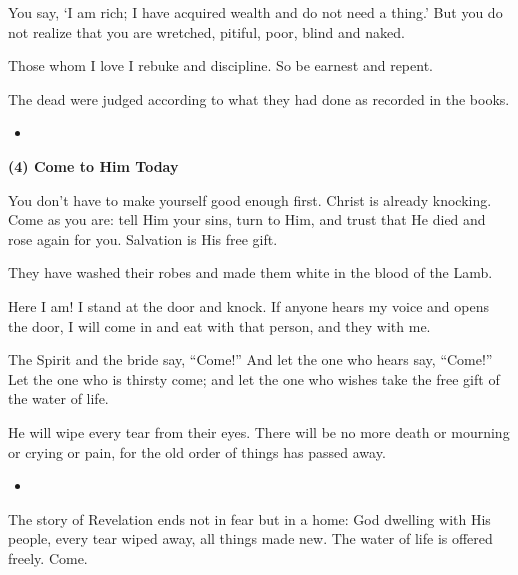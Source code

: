\begin{center}
\begin{tcolorbox}
\begin{ScriptureBox}
\item[3:17] You say, `I am rich; I have acquired wealth and do not need a thing.' But you do not realize that you are wretched, pitiful, poor, blind and naked.
\item[3:19] Those whom I love I rebuke and discipline. So be earnest and repent.
\item[20:12] The dead were judged according to what they had done as recorded in the books.
\end{ScriptureBox}

\begin{itemize}[leftmargin=2em, labelsep=0.3em]
\item[Q.] 
\end{itemize}

\vspace{0.3cm}

\textbf{(4) Come to Him Today}

You don't have to make yourself good enough first. Christ is already knocking. Come as you are: tell Him your sins, turn to Him, and trust that He died and rose again for you. Salvation is His free gift.

\begin{ScriptureBox}
\item[7:14] They have washed their robes and made them white in the blood of the Lamb.
\item[3:20] Here I am! I stand at the door and knock. If anyone hears my voice and opens the door, I will come in and eat with that person, and they with me.
\item[22:17] The Spirit and the bride say, ``Come!'' And let the one who hears say, ``Come!'' Let the one who is thirsty come; and let the one who wishes take the free gift of the water of life.
\item[21:4] He will wipe every tear from their eyes. There will be no more death or mourning or crying or pain, for the old order of things has passed away.
\end{ScriptureBox}

\begin{itemize}[leftmargin=2em, labelsep=0.3em]
\item[Q.] 
\end{itemize}

The story of Revelation ends not in fear but in a home: God dwelling with His people, every tear wiped away, all things made new. The water of life is offered freely. Come.

\end{tcolorbox}
\end{center}